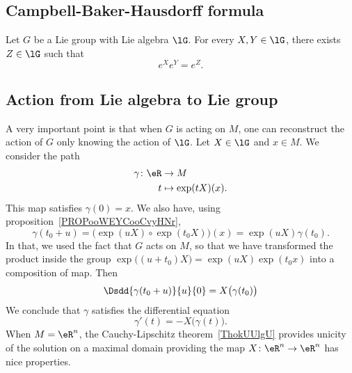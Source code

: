 \subsection{Campbell-Baker-Hausdorff formula}

\begin{theorem}     \label{THOooYJPEooSpKHnC}
    Let \( G\) be a Lie group with Lie algebra \( \lG\). For every \( X,Y\in \lG\), there exists \( Z\in \lG\) such that
    \begin{equation}
        e^{X} e^{Y}= e^{Z}.
    \end{equation}
\end{theorem}

\subsection{Action from Lie algebra to Lie group}

A very important point\cite{ooOLNIooDLmxkR} is that when \( G\) is acting on $M$, one can reconstruct the action of \( G\) only knowing the action of \( \lG\). Let \( X\in \lG\) and \( x\in M\). We consider the path
\begin{equation}
    \begin{aligned}
        \gamma\colon \eR&\to M \\
        t&\mapsto \exp(tX)(x).
    \end{aligned}
\end{equation}
This map satisfies \( \gamma(0)=x\). We also have, using proposition~\ref{PROPooWEYCooCvyHNr},
\begin{equation}
    \gamma(t_0+u)=\big( \exp(uX)\circ\exp(t_0X)\big)(x)=\exp(uX)\gamma(t_0).
\end{equation}
In that, we used the fact that \( G\) acts on \( M\), so that we have transformed the product inside the group \( \exp\big( (u+t_0)X \big)= \exp(uX)\exp(t_0x) \) into a composition of map.  Then
\begin{equation}
    \Dsdd{ \gamma(t_0+u) }{u}{0}=X\big( \gamma(t_0) \big)
\end{equation}
We conclude that \( \gamma\) satisfies the differential equation
\begin{equation}        \label{EQooFGSIooUplbmN}
    \gamma'(t)=-X\big( \gamma(t) \big).
\end{equation}
When \( M=\eR^n\), the Cauchy-Lipschitz theorem~\ref{ThokUUlgU} provides unicity of the solution on a maximal domain providing the map \( X\colon \eR^n\to \eR^n\) has nice properties.


